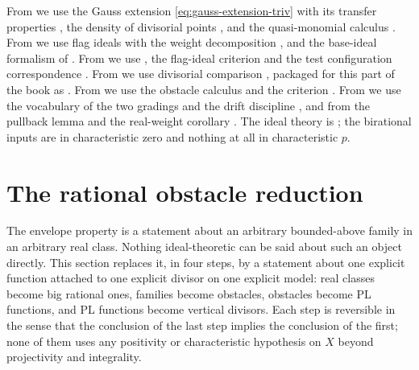 From  we use the Gauss extension
\eqref{eq:gauss-extension-triv} with its transfer properties
, the density of divisorial points
, and the quasi-monomial calculus
.  From
 we use flag ideals
 with the weight decomposition
, and the base-ideal formalism of
.  From  we use
,
the flag-ideal criterion  and the test
configuration correspondence .  From
 we use divisorial comparison
, packaged for this part of the book as
.  From
 we use the obstacle calculus
 and the criterion
.  From
 we use the vocabulary of the two gradings
 and the drift discipline
, and from  the
pullback lemma  and the real-weight
corollary .  The ideal theory is
; the birational inputs are
 in characteristic zero and nothing at all in
characteristic $p$.

\section{The rational obstacle reduction}
\label{sec:ch40-reduction}

The envelope property is a statement about an arbitrary bounded-above family
in an arbitrary real class.  Nothing ideal-theoretic can be said about such
an object directly.  This section replaces it, in four steps, by a statement
about one explicit function attached to one explicit divisor on one explicit
model: real classes become big rational ones, families become obstacles,
obstacles become PL functions, and PL functions become vertical divisors.
Each step is reversible in the sense that the conclusion of the last step
implies the conclusion of the first; none of them uses any positivity or
characteristic hypothesis on $X$ beyond projectivity and integrality.

